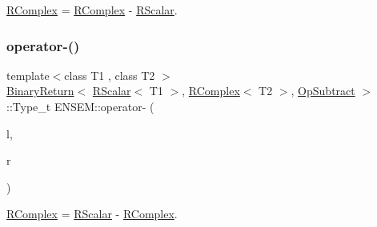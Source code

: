 \mbox{\hyperlink{classENSEM_1_1RComplex}{R\+Complex}} = \mbox{\hyperlink{classENSEM_1_1RComplex}{R\+Complex}} -\/ \mbox{\hyperlink{classENSEM_1_1RScalar}{R\+Scalar}}. 

\mbox{\label{group__rcomplex_ga92f922f58ca43c5692f794ecb95dc1f5}} 
\subsubsection{\texorpdfstring{operator-\/()}{operator-()}\hspace{0.1cm}{\footnotesize\ttfamily [4/4]}}
{\footnotesize\ttfamily template$<$class T1 , class T2 $>$ \\
\mbox{\hyperlink{structENSEM_1_1BinaryReturn}{Binary\+Return}}$<$ \mbox{\hyperlink{classENSEM_1_1RScalar}{R\+Scalar}}$<$ T1 $>$, \mbox{\hyperlink{classENSEM_1_1RComplex}{R\+Complex}}$<$ T2 $>$, \mbox{\hyperlink{structENSEM_1_1OpSubtract}{Op\+Subtract}} $>$\+::Type\+\_\+t E\+N\+S\+E\+M\+::operator-\/ (\begin{DoxyParamCaption}\item[{const \mbox{\hyperlink{classENSEM_1_1RScalar}{R\+Scalar}}$<$ T1 $>$ \&}]{l,  }\item[{const \mbox{\hyperlink{classENSEM_1_1RComplex}{R\+Complex}}$<$ T2 $>$ \&}]{r }\end{DoxyParamCaption})\hspace{0.3cm}{\ttfamily [inline]}}



\mbox{\hyperlink{classENSEM_1_1RComplex}{R\+Complex}} = \mbox{\hyperlink{classENSEM_1_1RScalar}{R\+Scalar}} -\/ \mbox{\hyperlink{classENSEM_1_1RComplex}{R\+Complex}}. 

\mbox{\label{group__rcomplex_ga60f2bd381cb984f9f438b894a2aef66f}} 
